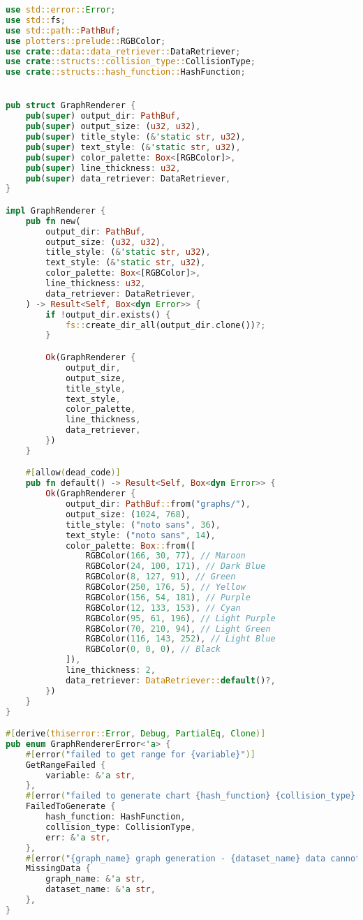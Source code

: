 \begin{lstlisting}[language=rust, caption={graphing/graph\_renderer.rs}]
use std::error::Error;
use std::fs;
use std::path::PathBuf;
use plotters::prelude::RGBColor;
use crate::data::data_retriever::DataRetriever;
use crate::structs::collision_type::CollisionType;
use crate::structs::hash_function::HashFunction;


pub struct GraphRenderer {
	pub(super) output_dir: PathBuf,
	pub(super) output_size: (u32, u32),
	pub(super) title_style: (&'static str, u32),
	pub(super) text_style: (&'static str, u32),
	pub(super) color_palette: Box<[RGBColor]>,
	pub(super) line_thickness: u32,
	pub(super) data_retriever: DataRetriever,
}

impl GraphRenderer {
	pub fn new(
		output_dir: PathBuf,
		output_size: (u32, u32),
		title_style: (&'static str, u32),
		text_style: (&'static str, u32),
		color_palette: Box<[RGBColor]>,
		line_thickness: u32,
		data_retriever: DataRetriever,
	) -> Result<Self, Box<dyn Error>> {
		if !output_dir.exists() {
			fs::create_dir_all(output_dir.clone())?;
		}

		Ok(GraphRenderer {
			output_dir,
			output_size,
			title_style,
			text_style,
			color_palette,
			line_thickness,
			data_retriever,
		})
	}

	#[allow(dead_code)]
	pub fn default() -> Result<Self, Box<dyn Error>> {
		Ok(GraphRenderer {
			output_dir: PathBuf::from("graphs/"),
			output_size: (1024, 768),
			title_style: ("noto sans", 36),
			text_style: ("noto sans", 14),
			color_palette: Box::from([
				RGBColor(166, 30, 77), // Maroon
				RGBColor(24, 100, 171), // Dark Blue
				RGBColor(8, 127, 91), // Green
				RGBColor(250, 176, 5), // Yellow
				RGBColor(156, 54, 181), // Purple
				RGBColor(12, 133, 153), // Cyan
				RGBColor(95, 61, 196), // Light Purple
				RGBColor(70, 210, 94), // Light Green
				RGBColor(116, 143, 252), // Light Blue
				RGBColor(0, 0, 0), // Black
			]),
			line_thickness: 2,
			data_retriever: DataRetriever::default()?,
		})
	}
}

#[derive(thiserror::Error, Debug, PartialEq, Clone)]
pub enum GraphRendererError<'a> {
	#[error("failed to get range for {variable}")]
	GetRangeFailed {
		variable: &'a str,
	},
	#[error("failed to generate chart {hash_function} {collision_type}: {err}")]
	FailedToGenerate {
		hash_function: HashFunction,
		collision_type: CollisionType,
		err: &'a str,
	},
	#[error("{graph_name} graph generation - {dataset_name} data cannot be empty!")]
	MissingData {
		graph_name: &'a str,
		dataset_name: &'a str,
	},
}
\end{lstlisting}

